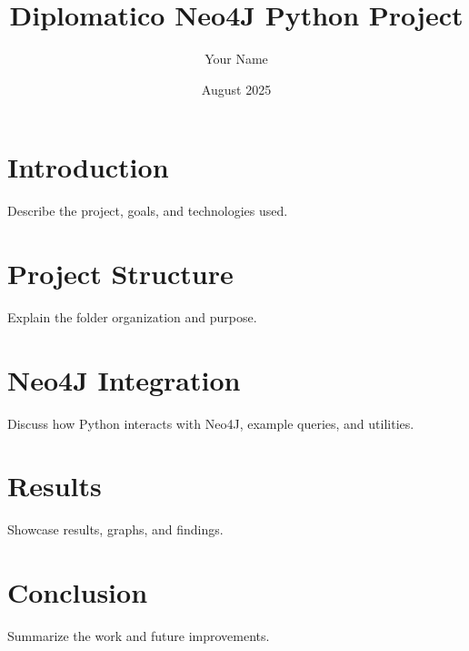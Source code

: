 \documentclass{article}
\title{Diplomatico Neo4J Python Project}
\author{Your Name}
\date{August 2025}
\begin{document}
\maketitle

\section{Introduction}
Describe the project, goals, and technologies used.

\section{Project Structure}
Explain the folder organization and purpose.

\section{Neo4J Integration}
Discuss how Python interacts with Neo4J, example queries, and utilities.

\section{Results}
Showcase results, graphs, and findings.

\section{Conclusion}
Summarize the work and future improvements.
\end{document}
